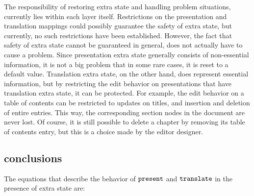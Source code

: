 The responsibility of restoring extra state and handling problem situations, currently lies within each layer itself. Restrictions on the presentation and translation mappings could possibly guarantee the safety of extra state, but currently, no such restrictions have been established. However, the fact that safety of extra state cannot be guaranteed in general, does not actually have to cause a problem. Since presentation extra state generally consists of non-essential information, it is not a big problem that in some rare cases, it is reset to a default value.  Translation extra state, on the other hand, does represent essential information, but by restricting the edit behavior on presentations that have translation extra state, it can be protected. For example, the edit behavior on a table of contents can be restricted to updates on titles, and insertion and deletion of entire entries. This way, the corresponding section nodes in the document are never lost. Of course, it is still possible to delete a chapter by removing its table of contents entry, but this is a choice made by the editor designer. 





%																
\subsection{conclusions}

The equations that describe the behavior of ${\tt present}$ and ${\tt translate}$ in the presence of extra state are:

